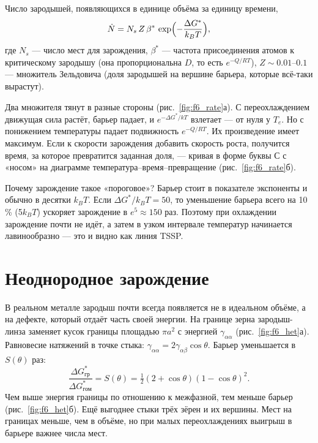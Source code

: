Число зародышей, появляющихся в единице объёма за единицу времени,
\begin{equation}
\dot N = N_s\,Z\,\beta^*\,\exp\Bigl(-\frac{\Delta G^*}{k_BT}\Bigr),
\end{equation}
где $N_s$ --- число мест для зарождения, $\beta^*$ --- частота присоединения атомов к критическому зародышу
(она пропорциональна $D$, то есть $e^{-Q/RT}$), $Z\sim0.01$--$0.1$ --- множитель Зельдовича (доля зародышей на
вершине барьера, которые всё-таки вырастут).

Два множителя тянут в разные стороны (рис.~\ref{fig:f6_rate}а). С переохлаждением движущая сила растёт, барьер
падает, и $e^{-\Delta G^*/kT}$ взлетает --- от нуля у $T_e$. Но с понижением температуры падает подвижность
$e^{-Q/RT}$. Их произведение имеет максимум. Если к скорости зарождения добавить скорость роста, получится время,
за которое превратится заданная доля, --- кривая в форме буквы С с «носом» на диаграмме
температура--время--превращение (рис.~\ref{fig:f6_rate}б).


\begin{idea}
Почему зарождение такое «пороговое»? Барьер стоит в показателе экспоненты и обычно в десятки $k_BT$. Если
$\Delta G^*/k_BT = 50$, то уменьшение барьера всего на 10\,\% (5$k_BT$) ускоряет зарождение в $e^5\approx150$ раз.
Поэтому при охлаждении зарождение почти не идёт, а затем в узком интервале температур начинается лавинообразно ---
это и видно как линия TSSP.
\end{idea}

\section{Неоднородное зарождение}

В реальном металле зародыш почти всегда появляется не в идеальном объёме, а на дефекте, который отдаёт часть своей
энергии. На границе зерна зародыш-линза заменяет кусок границы площадью $\pi a^2$ с энергией $\gamma_{\alpha\alpha}$
(рис.~\ref{fig:f6_het}а). Равновесие натяжений в точке стыка: $\gamma_{\alpha\alpha} = 2\gamma_{\alpha\beta}\cos\theta$.
Барьер уменьшается в $S(\theta)$ раз:
\begin{equation}
\frac{\Delta G^*_{\text{гр}}}{\Delta G^*_{\text{гом}}} = S(\theta) = \tfrac12(2+\cos\theta)(1-\cos\theta)^2 .
\end{equation}
Чем выше энергия границы по отношению к межфазной, тем меньше барьер (рис.~\ref{fig:f6_het}б). Ещё выгоднее
стыки трёх зёрен и их вершины. Мест на границах меньше, чем в объёме, но при малых переохлаждениях выигрыш в
барьере важнее числа мест.

